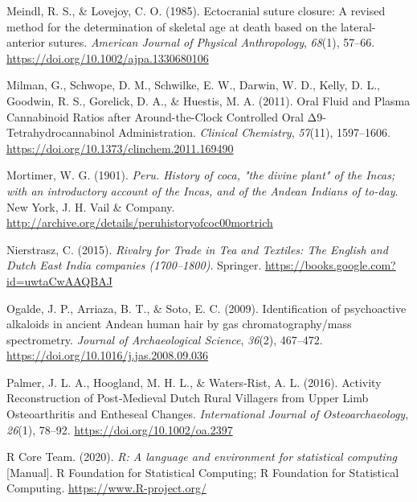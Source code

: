 \documentclass[
]{article}
\newlength{\cslhangindent}
\newlength{\cslentryspacingunit} %
\newenvironment{CSLReferences}[2] %
 {%
  \setlength{\parindent}{0pt}
  \ifodd #1
  \let\oldpar\par
  \def\par{\hangindent=\cslhangindent\oldpar}
  \fi
  \setlength{\parskip}{#2\cslentryspacingunit}
 }%
 {}
\begin{document}
\begin{CSLReferences}{1}{0}
\leavevmode{}%
Meindl, R. S., \& Lovejoy, C. O. (1985). Ectocranial suture closure: {A}
revised method for the determination of skeletal age at death based on
the lateral-anterior sutures. \emph{American Journal of Physical
Anthropology}, \emph{68}(1), 57--66.
\url{https://doi.org/10.1002/ajpa.1330680106}

\leavevmode{}%
Milman, G., Schwope, D. M., Schwilke, E. W., Darwin, W. D., Kelly, D.
L., Goodwin, R. S., Gorelick, D. A., \& Huestis, M. A. (2011). Oral
{Fluid} and {Plasma Cannabinoid Ratios} after {Around-the-Clock
Controlled Oral Δ9-Tetrahydrocannabinol Administration}. \emph{Clinical
Chemistry}, \emph{57}(11), 1597--1606.
\url{https://doi.org/10.1373/clinchem.2011.169490}

\leavevmode{}%
Mortimer, W. G. (1901). \emph{Peru. {History} of coca, "the divine
plant" of the {Incas}; with an introductory account of the {Incas}, and
of the {Andean Indians} of to-day}. {New York, J. H. Vail \& Company}.
\url{http://archive.org/details/peruhistoryofcoc00mortrich}

\leavevmode{}%
Nierstrasz, C. (2015). \emph{Rivalry for {Trade} in {Tea} and
{Textiles}: {The English} and {Dutch East India} companies
(1700--1800)}. {Springer}.
\url{https://books.google.com?id=uwtaCwAAQBAJ}

\leavevmode{}%
Ogalde, J. P., Arriaza, B. T., \& Soto, E. C. (2009). Identification of
psychoactive alkaloids in ancient {Andean} human hair by gas
chromatography/mass spectrometry. \emph{Journal of Archaeological
Science}, \emph{36}(2), 467--472.
\url{https://doi.org/10.1016/j.jas.2008.09.036}

\leavevmode{}%
Palmer, J. L. A., Hoogland, M. H. L., \& Waters‐Rist, A. L. (2016).
Activity {Reconstruction} of {Post}‐{Medieval Dutch Rural Villagers}
from {Upper Limb Osteoarthritis} and {Entheseal Changes}.
\emph{International Journal of Osteoarchaeology}, \emph{26}(1), 78--92.
\url{https://doi.org/10.1002/oa.2397}

\leavevmode{}%
R Core Team. (2020). \emph{R: {A} language and environment for
statistical computing} {[}Manual{]}. {R Foundation for Statistical
Computing}; {R Foundation for Statistical Computing}.
\url{https://www.R-project.org/}


\end{CSLReferences}
\end{document}
